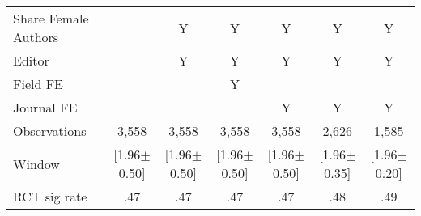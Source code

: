 \begin{tabular}{l*{6}{c}}
Share Female Authors &         &        Y&        Y&        Y&        Y&        Y\\
Editor          &         &        Y&        Y&        Y&        Y&        Y\\
Field FE        &         &         &        Y&         &         &         \\
Journal FE      &         &         &         &        Y&        Y&        Y\\
\hline
Observations    &    3,558&    3,558&    3,558&    3,558&    2,626&    1,585\\
Window          &[1.96$\pm$0.50]&[1.96$\pm$0.50]&[1.96$\pm$0.50]&[1.96$\pm$0.50]&[1.96$\pm$0.35]&[1.96$\pm$0.20]\\
RCT sig rate    &      .47&      .47&      .47&      .47&      .48&      .49\\
\hline\hline
\end{tabular}
